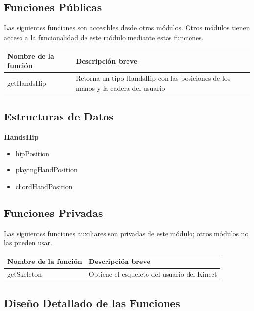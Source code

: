 \documentclass[a4paper,10pt]{article}
\begin{document}
\subsection{Funciones Públicas}
Las siguientes funciones son accesibles desde otros módulos. Otros módulos
tienen acceso a la funcionalidad de este módulo mediante estas funciones.
~\\

\begin{tabular}{| p{30mm} | p{10cm} |}
        \hline
        \textbf{Nombre de la \mbox{función}} & \textbf{Descripción breve} \\
        \hline
        getHandsHip & Retorna un tipo HandsHip con las posiciones de los manos y
        la cadera del usuario \\
        \hline
\end{tabular}
\subsection{Estructuras de Datos}
\textbf{HandsHip}
\begin{itemize}
        \item hipPosition
        \item playingHandPosition
        \item chordHandPosition 
\end{itemize}
\subsection{Funciones Privadas}
Las siguientes funciones auxiliares son privadas de este módulo; otros módulos
no las pueden usar.~\\

\begin{tabular}{| p{30mm} | p{10cm} |}
        \hline
        \textbf{Nombre de la \mbox{función}} & \textbf{Descripción breve} \\
        \hline
        getSkeleton & Obtiene el esqueleto del usuario del Kinect \\
        \hline
\end{tabular}
\subsection{Diseño Detallado de las Funciones}
\end{document}
